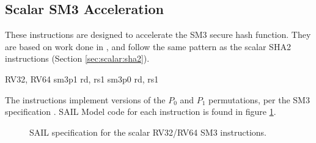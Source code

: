 
\newpage
\subsection{Scalar SM3 Acceleration}
\label{sec:scalar:sm3}

These instructions are designed to accelerate the SM3 secure
hash function\cite{ietf:sm3}.
They are based on work done in \cite{MJS:LWSHA:20}, and follow
the same pattern as the scalar SHA2 instructions
(Section \ref{sec:scalar:sha2}).

\begin{cryptoisa}
RV32, RV64
    sm3p1 rd, rs1
    sm3p0 rd, rs1
\end{cryptoisa}

The instructions implement versions of the $P_0$ and $P_1$
permutations, per the SM3 specification \cite{ietf:sm3}.
SAIL Model code for each instruction is found in figure
\ref{fig:sail:sm3}.

\begin{figure}[h]

\caption{SAIL specification for the scalar RV32/RV64 SM3 instructions.}
\label{fig:sail:sm3}
\end{figure}
